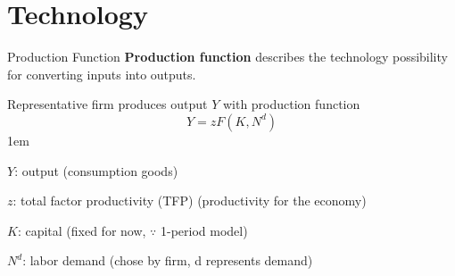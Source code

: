 \documentclass[11pt,aspectratio=43]{beamer}
\let\olditemize=\itemize
\let\endolditemize=\enditemize
\renewenvironment{itemize}{\olditemize \itemsep1em}{\endolditemize}
\theoremstyle{definition}
\begin{document}
\section{Technology}
\label{sec:Technology}

\begin{frame}{Production Function}
\label{slide:Production_Function}
    \textbf{Production function} describes the technology possibility for \alert{converting inputs into outputs}.

    Representative firm produces output $ Y $ with production function
    \begin{equation}
    \label{eq:production}
         Y = z F( K, N^{d} )
    \end{equation}
    \begin{itemize}
        \item $ Y $: output (consumption goods)
        \item $ z $: \alert{total factor productivity (TFP)} (productivity for the economy)
        \item $ K $: capital (fixed for now, $ \because $ 1-period model)
        \item $ N^{d} $: labor demand (chose by firm, \alert{d} represents demand)
    \end{itemize}
\end{frame}
\end{document}
